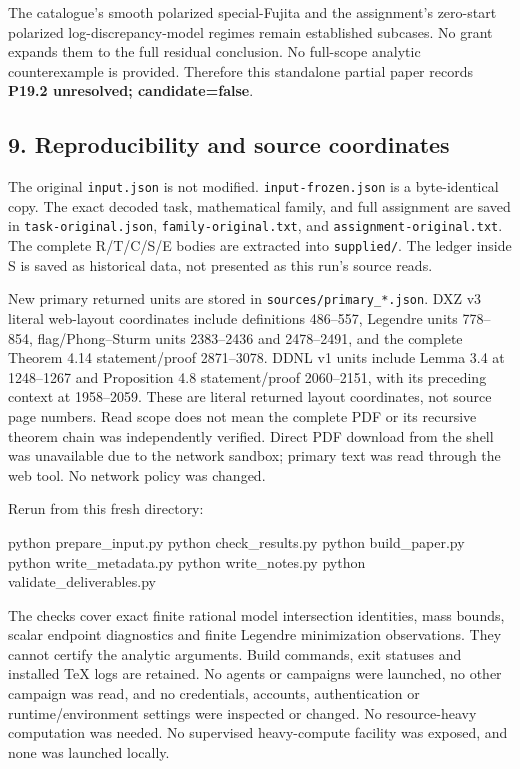 \documentclass[
  11pt,
]{article}
\newenvironment{Shaded}{}{}
\newcommand{\NormalTok}[1]{#1}
\begin{document}
The catalogue's smooth polarized special-Fujita and the assignment's
zero-start polarized log-discrepancy-model regimes remain established
subcases. No grant expands them to the full residual conclusion. No
full-scope analytic counterexample is provided. Therefore this
standalone partial paper records \textbf{P19.2 unresolved;
candidate=false}.

\subsection{9. Reproducibility and source
coordinates}\label{reproducibility-and-source-coordinates}

The original \texttt{input.json} is not modified.
\texttt{input-frozen.json} is a byte-identical copy. The exact decoded
task, mathematical family, and full assignment are saved in
\texttt{task-original.json}, \texttt{family-original.txt}, and
\texttt{assignment-original.txt}. The complete R/T/C/S/E bodies are
extracted into \texttt{supplied/}. The ledger inside S is saved as
historical data, not presented as this run's source reads.

New primary returned units are stored in
\texttt{sources/primary\_*.json}. DXZ v3 literal web-layout coordinates
include definitions 486--557, Legendre units 778--854, flag/Phong--Sturm
units 2383--2436 and 2478--2491, and the complete Theorem 4.14
statement/proof 2871--3078. DDNL v1 units include Lemma 3.4 at
1248--1267 and Proposition 4.8 statement/proof 2060--2151, with its
preceding context at 1958--2059. These are literal returned layout
coordinates, not source page numbers. Read scope does not mean the
complete PDF or its recursive theorem chain was independently verified.
Direct PDF download from the shell was unavailable due to the network
sandbox; primary text was read through the web tool. No network policy
was changed.

Rerun from this fresh directory:

\begin{Shaded}
\begin{Highlighting}[]
\NormalTok{python prepare\_input.py}
\NormalTok{python check\_results.py}
\NormalTok{python build\_paper.py}
\NormalTok{python write\_metadata.py}
\NormalTok{python write\_notes.py}
\NormalTok{python validate\_deliverables.py}
\end{Highlighting}
\end{Shaded}

The checks cover exact finite rational model intersection identities,
mass bounds, scalar endpoint diagnostics and finite Legendre
minimization observations. They cannot certify the analytic arguments.
Build commands, exit statuses and installed TeX logs are retained. No
agents or campaigns were launched, no other campaign was read, and no
credentials, accounts, authentication or runtime/environment settings
were inspected or changed. No resource-heavy computation was needed. No
supervised heavy-compute facility was exposed, and none was launched
locally.
\end{document}
